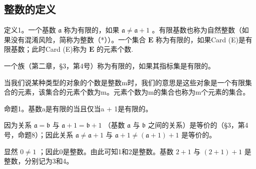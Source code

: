 \subsection{整数的定义}

定义1。一个基数 \(\mathfrak{a}\) 称为有限的，如果 \(\mathfrak{a} \neq \mathfrak{a} + 1\) 。有限基数也称为自然整数（如果没有混淆风险，简称为整数（*））。一个集合 \(\mathbf{E}\) 称为有限的，如果Card (E)是有限基数；此时Card (E)称为 \(\mathbf{E}\) 的元素个数.

一个族（第二章，§3，第4号）称为有限的，如果其指标集是有限的。

当我们说某种类型的对象的个数是整数m时，我们的意思是这些对象是一个有限集合的元素，该集合的元素个数为m。元素个数为m的集合也称为m个元素的集合。

命题1。基数a是有限的当且仅当a + 1是有限的。

因为关系 \(\mathfrak{a} = \mathfrak{b}\) 与 \(\mathfrak{a} + 1 = \mathfrak{b} + 1\) （基数 \(\mathfrak{a}\) 与 \(\mathfrak{b}\) 之间的关系）是等价的（§3，第4号，命题8）；因此关系 \(\mathfrak{a} \neq \mathfrak{a} + 1\) 与 \(\mathfrak{a} + 1 \neq (\mathfrak{a} + 1) + 1\) 是等价的。

显然 \(0 \neq 1\) ；因此0是整数。由此可知1和2是整数。基数 \(2 + 1\) 与 \((2 + 1) + 1\) 是整数，分别记为3和4。

